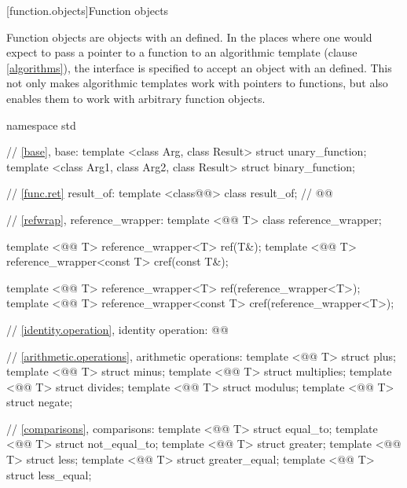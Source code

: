 \documentclass[american,twoside]{book}
\begin{document}
\setcounter{section}{4}
[function.objects]{Function objects}

\pnum
Function objects are objects with an  defined.
In the places where one would expect to pass a pointer to a function to an
algorithmic template (clause \ref{algorithms}), the interface is specified to accept an object with an
defined.
This not only makes algorithmic templates work with pointers to functions, but
also enables them to work with arbitrary function objects.

\pnum
{}
%

\begin{codeblock}
namespace std {
  // \ref{base}, base:
  template <class Arg, class Result> struct unary_function;
  template <class Arg1, class Arg2, class Result> struct binary_function;

  // \marktr{}\ref{func.ret} result_of:
  template <class@@> class result_of;   // 
  @@

  // \marktr{}\ref{refwrap}, reference_wrapper:
  template <@@ T> class reference_wrapper; 

  template <@@ T> reference_wrapper<T> ref(T&);
  template <@@ T> reference_wrapper<const T> cref(const T&);

  template <@@ T> reference_wrapper<T> ref(reference_wrapper<T>);
  template <@@ T> reference_wrapper<const T> cref(reference_wrapper<T>);

  // \ref{identity.operation}, identity operation:
  @@

  //    \ref{arithmetic.operations}, arithmetic operations:
  template <@@ T> struct plus;
  template <@@ T> struct minus;
  template <@@ T> struct multiplies;
  template <@@ T> struct divides;
  template <@@ T> struct modulus;
  template <@@ T> struct negate;

  // \ref{comparisons}, comparisons:
  template <@@ T> struct equal_to;
  template <@@ T> struct not_equal_to;
  template <@@ T> struct greater;
  template <@@ T> struct less;
  template <@@ T> struct greater_equal;
  template <@@ T> struct less_equal;

}
\end{codeblock}
\end{document}
